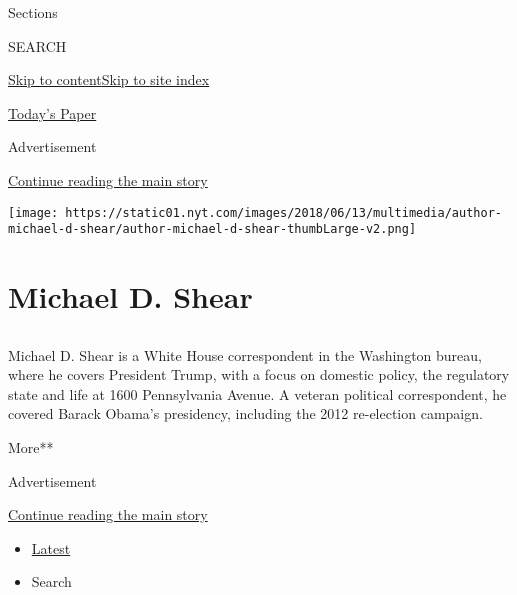 Sections

SEARCH

\protect\hyperlink{site-content}{Skip to
content}\protect\hyperlink{site-index}{Skip to site index}

\href{https://myaccount.nytimes.com/auth/login?response_type=cookie\&client_id=vi}{}

\href{https://www.nytimes.com/section/todayspaper}{Today's Paper}

Advertisement

\protect\hyperlink{after-top}{Continue reading the main story}

\texttt{[image: https://static01.nyt.com/images/2018/06/13/multimedia/author-michael-d-shear/author-michael-d-shear-thumbLarge-v2.png]}

\hypertarget{michael-d-shear}{%
\section{Michael D. Shear}\label{michael-d-shear}}

\subsection{}

Michael D. Shear is a White House correspondent in the Washington
bureau, where he covers President Trump, with a focus on domestic
policy, the regulatory state and life at 1600 Pennsylvania Avenue. A
veteran political correspondent, he covered Barack Obama's presidency,
including the 2012 re-election campaign.

More**

Advertisement

\protect\hyperlink{after-mid1}{Continue reading the main story}

\begin{itemize}
\tightlist
\item
  \protect\hyperlink{stream-panel}{Latest}
\item
  Search
\end{itemize}

